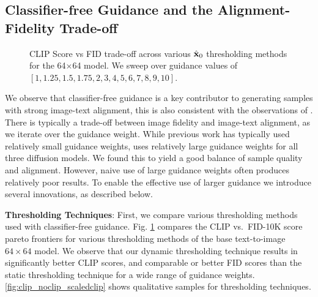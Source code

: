 \subsection{Classifier-free Guidance and the Alignment-Fidelity Trade-off}

\begin{figure}
\centering

\caption{CLIP Score vs FID trade-off across various $\hat{\mathbf{x}}_0$ thresholding methods for the 64$\times$64 model. We sweep over guidance values of $[1, 1.25, 1.5, 1.75, 2, 3, 4, 5, 6, 7, 8, 9, 10]$.
}
\label{fig:clip_vs_scaled_clip}
\end{figure}




We observe that classifier-free guidance \cite{ho2021classifierfree} is a key contributor to generating samples with strong image-text alignment, this is also consistent with the observations of \cite{ramesh-dalle, ramesh-dalle2}. There is typically a trade-off between image fidelity and image-text alignment, as we iterate over the guidance weight. 
While previous work has typically used relatively small guidance weights, \name uses relatively large guidance weights for all three diffusion models.  We found this to yield a good balance of sample quality and alignment.
However, naive use of large guidance weights often produces relatively poor results. To enable the effective use of larger guidance we introduce several innovations, as described below.


\textbf{Thresholding Techniques}: First, we compare various thresholding methods used with classifier-free guidance. Fig.  \ref{fig:clip_vs_scaled_clip} compares the CLIP vs.\ FID-10K score pareto frontiers for various thresholding methods of the base text-to-image $64\times64$ model. We observe that our dynamic thresholding technique results in significantly better CLIP scores, and comparable or better FID scores than the static thresholding technique for a wide range of guidance weights. \cref{fig:clip_noclip_scaledclip} shows qualitative samples for thresholding techniques.

